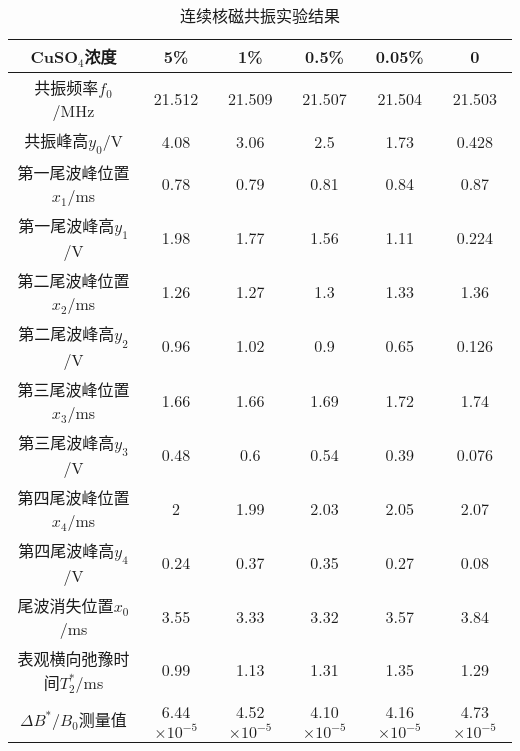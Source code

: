 \begin{table}[htbp!]
	\centering
	\caption{连续核磁共振实验结果}\label{tab:Continuous}	\begin{tabular}{c||c|c|c|c|c}
		\hline\hline
		CuSO$_4$浓度 & 5\% & 1\% & 0.5\% & 0.05\% & 0\\		\hline\hline
		共振频率$f_0$/MHz & 21.512 & 21.509 & 21.507 & 21.504 & 21.503\\		\hline
		共振峰高$y_0$/V & 4.08 & 3.06 & 2.5 & 1.73 & 0.428\\		\hline
		第一尾波峰位置$x_1$/ms & 0.78 & 0.79 & 0.81 & 0.84 & 0.87\\		\hline
		第一尾波峰高$y_1$/V & 1.98 & 1.77 & 1.56 & 1.11 & 0.224\\		\hline
		第二尾波峰位置$x_2$/ms & 1.26 & 1.27 & 1.3 & 1.33 & 1.36\\		\hline
		第二尾波峰高$y_2$/V & 0.96 & 1.02 & 0.9 & 0.65 & 0.126\\		\hline
		第三尾波峰位置$x_3$/ms & 1.66 & 1.66 & 1.69 & 1.72 & 1.74\\		\hline
		第三尾波峰高$y_3$/V & 0.48 & 0.6 & 0.54 & 0.39 & 0.076\\		\hline
		第四尾波峰位置$x_4$/ms & 2 & 1.99 & 2.03 & 2.05 & 2.07\\		\hline
		第四尾波峰高$y_4$/V & 0.24 & 0.37 & 0.35 & 0.27 & 0.08\\		\hline
		尾波消失位置$x_0$/ms & 3.55 & 3.33 & 3.32 & 3.57 & 3.84\\		\hline
		表观横向弛豫时间$T^{*}_2$/ms & 0.99 & 1.13 & 1.31 & 1.35 & 1.29\\		\hline
		$\Delta B^*/B_0$测量值 & 6.44$\times 10^{-5}$ & 4.52$\times 10^{-5}$ & 4.10$\times 10^{-5}$ & 4.16$\times 10^{-5}$ & 4.73$\times 10^{-5}$\\		\hline\hline
	\end{tabular}
\end{table}